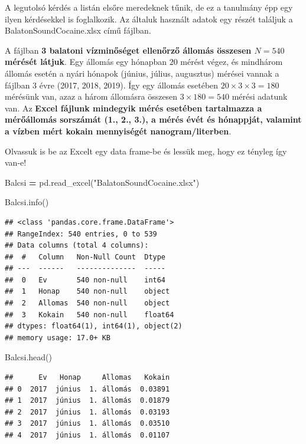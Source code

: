 \documentclass[
]{book}
\newenvironment{Shaded}{\begin{snugshade}}{\end{snugshade}}
\newcommand{\NormalTok}[1]{#1}
\newcommand{\OperatorTok}[1]{\textcolor[rgb]{0.81,0.36,0.00}{\textbf{#1}}}
\newcommand{\StringTok}[1]{\textcolor[rgb]{0.31,0.60,0.02}{#1}}
\begin{document}
A legutolsó kérdés a listán elsőre meredeknek tűnik, de ez a tanulmány épp egy ilyen kérdésekkel is foglalkozik. Az általuk használt adatok egy részét találjuk a BalatonSoundCocaine.xlsx című fájlban.

A fájlban \textbf{3 balatoni vízminőséget ellenőrző állomás összesen \(N=540\) mérését látjuk}. Egy állomás egy hónapban \(20\) mérést végez, és mindhárom állomás esetén a nyári hónapok (június, július, augusztus) mérései vannak a fájlban 3 évre (2017, 2018, 2019). Így egy állomás esetében \(20 \times 3 \times 3 = 180\) mérésünk van, azaz a három állomásra összesen \(3 \times 180 = 540\) mérési adatunk van. Az \textbf{Excel fájlunk mindegyik mérés esetében tartalmazza a mérőállomás sorszámát (1., 2., 3.), a mérés évét és hónappját, valamint a vízben mért kokain mennyiségét nanogram/literben}.

Olvassuk is be az Excelt egy data frame-be és lessük meg, hogy ez tényleg így van-e!

\begin{Shaded}
\begin{Highlighting}[]
\NormalTok{Balcsi }\OperatorTok{=}\NormalTok{ pd.read\_excel(}\StringTok{"BalatonSoundCocaine.xlsx"}\NormalTok{)}

\NormalTok{Balcsi.info()}
\end{Highlighting}
\end{Shaded}

\begin{verbatim}
## <class 'pandas.core.frame.DataFrame'>
## RangeIndex: 540 entries, 0 to 539
## Data columns (total 4 columns):
##  #   Column   Non-Null Count  Dtype  
## ---  ------   --------------  -----  
##  0   Ev       540 non-null    int64  
##  1   Honap    540 non-null    object 
##  2   Allomas  540 non-null    object 
##  3   Kokain   540 non-null    float64
## dtypes: float64(1), int64(1), object(2)
## memory usage: 17.0+ KB
\end{verbatim}

\begin{Shaded}
\begin{Highlighting}[]
\NormalTok{Balcsi.head()}
\end{Highlighting}
\end{Shaded}

\begin{verbatim}
##      Ev   Honap     Allomas   Kokain
## 0  2017  június  1. állomás  0.03891
## 1  2017  június  1. állomás  0.01879
## 2  2017  június  1. állomás  0.03193
## 3  2017  június  1. állomás  0.03510
## 4  2017  június  1. állomás  0.01107
\end{verbatim}
\end{document}
